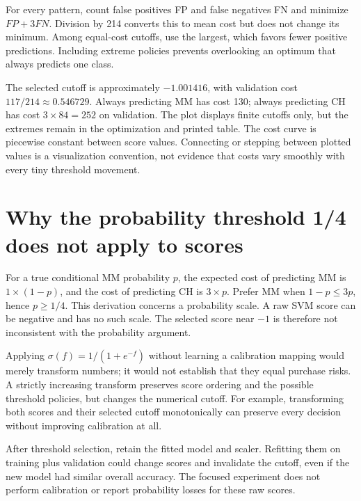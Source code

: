 For every pattern, count false positives FP and false negatives FN and minimize $FP+3FN$.
Division by 214 converts this to mean cost but does not change its minimum. Among equal-cost cutoffs, use the largest,
which favors fewer positive predictions. Including extreme policies prevents overlooking an optimum that always predicts one class.

The selected cutoff is approximately $-1.001416$, with validation cost $117/214\approx0.546729$.
Always predicting MM has cost 130; always predicting CH has cost $3\times84=252$ on validation.
The plot displays finite cutoffs only, but the extremes remain in the optimization and printed table.
The cost curve is piecewise constant between score values. Connecting or stepping between plotted values is a
visualization convention, not evidence that costs vary smoothly with every tiny threshold movement.

\section{Why the probability threshold 1/4 does not apply to scores}
For a true conditional MM probability $p$, the expected cost of predicting MM is $1\times(1-p)$,
and the cost of predicting CH is $3\times p$. Prefer MM when $1-p\le3p$, hence $p\ge1/4$.
This derivation concerns a probability scale. A raw SVM score can be negative and has no such scale.
The selected score near $-1$ is therefore not inconsistent with the probability argument.

Applying $\sigma(f)=1/(1+e^{-f})$ without learning a calibration mapping would merely transform numbers;
it would not establish that they equal purchase risks. A strictly increasing transform preserves score ordering
and the possible threshold policies, but changes the numerical cutoff. For example, transforming both scores
and their selected cutoff monotonically can preserve every decision without improving calibration at all.

After threshold selection, retain the fitted model and scaler. Refitting them on training plus validation
could change scores and invalidate the cutoff, even if the new model had similar overall accuracy.
The focused experiment does not perform calibration or report probability losses for these raw scores.

